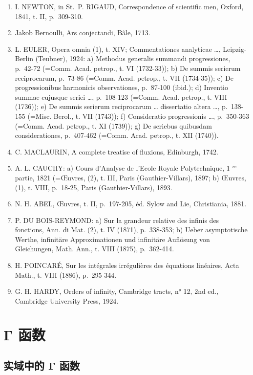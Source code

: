 \begin{enumerate}
\def\labelenumi{(\Roman{enumi})}
\item
  I. NEWTON, in St.~P. RIGAUD, Correspondence of scientific men, Oxford, 1841, t. II, p.~309-310.
\item
  Jakob Bernoulli, Ars conjectandi, Bâle, 1713.
\item
  L. EULER, Opera omnia (1), t. XIV; Commentationes analyticae \ldots, Leipzig-Berlin (Teubner), 1924: a) Methodus generalis summandi progressiones, p.~42-72 (=Comm. Acad. petrop., t. VI (1732-33)); b) De summis serierum reciprocarum, p.~73-86 (=Comm. Acad. petrop., t. VII (1734-35)); c) De progressionibus harmonicis observationes, p.~87-100 (ibid.); d) Inventio summae cujusque seriei \ldots, p.~108-123 (=Comm. Acad. petrop., t. VIII (1736)); e) De summis serierum reciprocarum \ldots{} dissertatio altera \ldots, p.~138-155 (=Misc. Berol., t. VII (1743)); f) Consideratio progressionis \ldots, p.~350-363 (=Comm. Acad. petrop., t. XI (1739)); g) De seriebus quibusdam considerationes, p.~407-462 (=Comm. Acad. petrop., t. XII (1740)).
\item
  C. MACLAURIN, A complete treatise of fluxions, Edinburgh, 1742.
\item
  A. L. CAUCHY: a) Cours d'Analyse de l'Ecole Royale Polytechnique, 1 \(^{re}\) partie, 1821 (=Œuvres, (2), t. III, Paris (Gauthier-Villars), 1897; b) Œuvres, (1), t. VIII, p.~18-25, Paris (Gauthier-Villars), 1893.
\item
  N. H. ABEL, Œuvres, t. II, p.~197-205, éd. Sylow and Lie, Christiania, 1881.
\item
  P. DU BOIS-REYMOND: a) Sur la grandeur relative des infinis des fonctions, Ann. di Mat. (2), t. IV (1871), p.~338-353; b) Ueber asymptotische Werthe, infinitäre Approximationen und infinitäre Auflösung von Gleichungen, Math. Ann., t. VIII (1875), p.~362-414.
\item
  H. POINCARÉ, Sur les intégrales irrégulières des équations linéaires, Acta Math., t. VIII (1886), p.~295-344.
\item
  G. H. HARDY, Orders of infinity, Cambridge tracts, n° 12, 2nd ed., Cambridge University Press, 1924.
\end{enumerate}

\chapter{Γ 函数}

\section{实域中的 Γ 函数}

